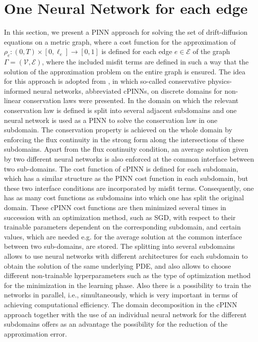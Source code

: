\section{One Neural Network for each edge}
\label{ch3:sec2}

In this section, we present a PINN approach for solving the set of drift-diffusion equations on a metric graph, where a cost function for the approximation of $\rho_e \colon (0,T) \times [0, \ell_e] \to [0, 1]$ is defined for each edge $e \in \mathcal{E}$ of the graph $\Gamma = (\mathcal{V}, \mathcal{E})$, where the included misfit terms are defined in such a way that the solution of the approximation problem on the entire graph is ensured. The idea for this approach is adopted from \cite{JagtapKharazmiKarniadakis:2020}, in which so-called conservative physics-informed neural networks, abbreviated cPINNs, on discrete domains for non-linear conservation laws were presented. In \cite{JagtapKharazmiKarniadakis:2020} the domain on which the relevant conservation law is defined is split into several adjacent subdomains and one neural network is used as a PINN to solve the conservation law in one subdomain. The conservation property is achieved on the whole domain by enforcing the flux continuity in the strong form along the intersections of these subdomains. Apart from the flux continuity condition, an average solution given by two different neural networks is also enforced at the common interface between two sub-domains. The cost function of cPINN is defined for each subdomain, which has a similar structure as the PINN cost function in each subdomain, but these two interface conditions are incorporated by misfit terms. Consequently, one has as many cost functions as subdomains into which one has split the original domain. These cPINN cost functions are then minimized several times in succession with an optimization method, such as SGD, with respect to their trainable parameters dependent on the corresponding subdomain, and certain values, which are needed e.g. for the average solution at the common interface between two sub-domains, are stored. The splitting into several subdomains allows to use neural networks with different architectures for each subdomain to obtain the solution of the same underlying PDE, and also allows to choose different non-trainable hyperparameters such as the type of optimization method for the minimization in the learning phase. Also there is a possibility to train the networks in parallel, i.e., simultaneously, which is very important in terms of achieving computational efficiency. The domain decomposition in the cPINN approach together with the use of an individual neural network for the different subdomains offers as an advantage the possibility for the reduction of the approximation error. \\
